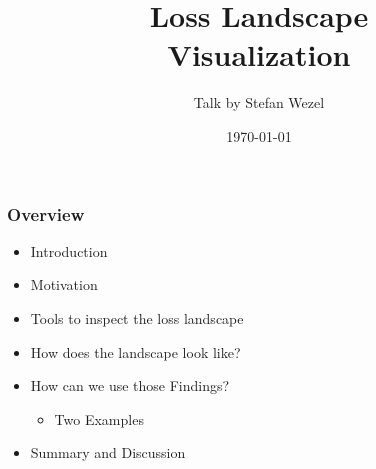 \documentclass[9pt]{beamer}
\title{Loss Landscape \\ Visualization}
\author{Talk by Stefan Wezel}
\institute{Optimization and Neural Architecture Search}
\date{\today}
\begin{document}
	

\begin{frame}[plain]
	\titlepage
\end{frame} 



\begin{frame}
\frametitle{Overview}
\begin{itemize}%
	\item Introduction
	\item Motivation
	\item Tools to inspect the loss landscape
	\item How does the landscape look like?
	\item How can we use those Findings?
	\begin{itemize}
		\item Two Examples
	\end{itemize}
	\item Summary and Discussion
\end{itemize}
\end{frame} 
\end{document}
